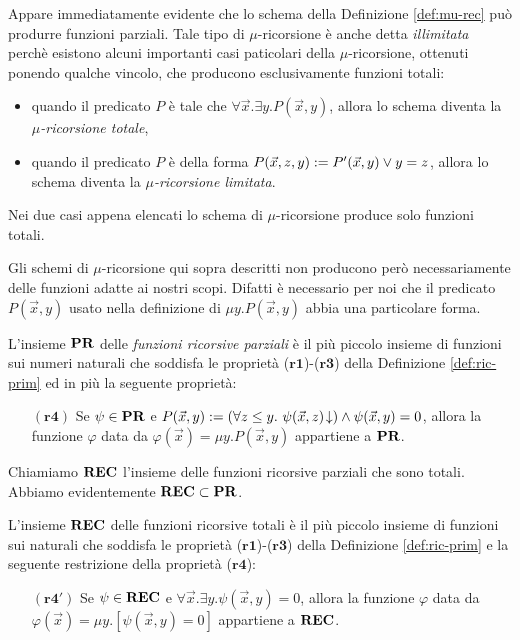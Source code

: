 \documentclass[runningheads,a4paper]{llncs}
\begin{document}
Appare immediatamente evidente che lo schema della Definizione \ref{def:mu-rec} pu\`{o} produrre funzioni parziali. Tale tipo di $\mu$-ricorsione \`{e} anche detta \emph{illimitata} perch\`{e} esistono alcuni importanti casi paticolari della $\mu$-ricorsione, ottenuti ponendo qualche vincolo, che producono esclusivamente funzioni totali:
\begin{itemize}
\item quando il predicato $P$ \`{e} tale che $\forall \vec x.\exists y.P(\vec x,y)$, allora lo schema diventa la \emph{$\mu$-ricorsione totale},
\item quando il predicato $P$ \`{e} della forma $P(\vec x,z,y) \mathrel{:=} P'(\vec x,y) \vee y = z$, allora lo schema diventa la \emph{$\mu$-ricorsione limitata}. 
\end{itemize}
Nei due casi appena elencati lo schema di $\mu$-ricorsione produce solo funzioni totali. 

Gli schemi di $\mu$-ricorsione qui sopra descritti non producono per\`{o} necessariamente delle funzioni adatte ai nostri scopi. Difatti \`{e} necessario per noi che il predicato $P(\vec x,y)$ usato nella definizione di $\mu y.P(\vec x,y)$ abbia una particolare forma.

\begin{definition}\label{def:ric-par}
L'insieme $\mathbf{PR}$ delle \emph{funzioni ricorsive parziali} \`{e} il pi\`{u} piccolo insieme di funzioni sui numeri naturali che soddisfa le propriet\`{a} ($\mathbf{r1}$)-($\mathbf{r3}$) della Definizione \ref{def:ric-prim} ed in pi\`{u} la seguente propriet\`{a}:
\begin{itemize}
\item[$(\mathbf{r4})$] Se $\psi \in \mathbf{PR}$ e $P(\vec x,y) \ass (\forall z \leq y.\ \conv{\psi(\vec x,z)}) \wedge \psi(\vec x,y) = 0$, allora la funzione $\varphi$ data da $\varphi(\vec x) = \mu y.P(\vec x,y)$ appartiene a $\mathbf{PR}$.
\end{itemize}
\end{definition}

Chiamiamo $\mathbf{REC}$ l'insieme delle funzioni ricorsive parziali che sono totali. Abbiamo evidentemente $\mathbf{REC} \subset \mathbf{PR}$.

\begin{lemma}\label{lem:ric-tot}
L'insieme $\mathbf{REC}$ delle funzioni ricorsive totali \`{e} il pi\`{u} piccolo insieme di funzioni sui naturali che soddisfa le propriet\`{a} ($\mathbf{r1}$)-($\mathbf{r3}$) della Definizione \ref{def:ric-prim} e la seguente restrizione della propriet\`{a} ($\mathbf{r4}$):
\begin{itemize}
\item[$(\mathbf{r4}')$] Se $\psi \in \mathbf{REC}$ e $\forall \vec x.\exists y.\psi(\vec x,y) = 0$, allora la funzione $\varphi$ data da $\varphi(\vec x) = \mu y.[\psi(\vec x,y) = 0]$ appartiene a $\mathbf{REC}$.
\end{itemize}
\end{lemma}
\end{document}
